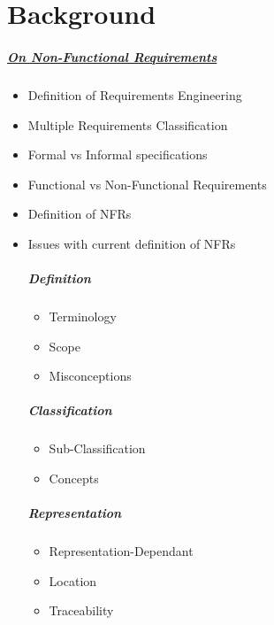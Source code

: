 \documentclass[dissertation]{softeng}
\begin{document}
\chapter{Background}
\paragraph*{\underline{On Non-Functional Requirements}}\cite{Glinz:2007ehba}
\begin{itemize}
\item Definition of Requirements Engineering
\item Multiple Requirements Classification
\item Formal vs Informal specifications
\item Functional vs Non-Functional Requirements
\item Definition of NFRs
\item Issues with current definition of NFRs
\paragraph{Definition}
\begin{itemize}
\item Terminology
\item Scope
\item Misconceptions
\end{itemize}
\paragraph{Classification}
\begin{itemize}
\item Sub-Classification
\item Concepts
\end{itemize}
\paragraph{Representation}
\begin{itemize}
\item Representation-Dependant
\item Location
\item Traceability
\end{itemize}
\end{itemize}
\pagebreak
\end{document}
